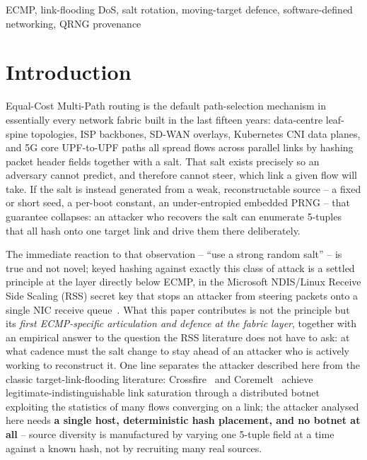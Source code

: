 \documentclass[conference]{IEEEtran}
\begin{document}
\begin{abstract}
CSPRNG case under this threat model -- an honest null result -- but the QRNG-as-a-service channel adds a
practical, auditable capability a CSPRNG cannot: a signed, per-draw entropy provenance receipt suited to
compliance- and attestation-sensitive multi-tenant deployments. We position the contribution carefully against
adjacent prior art -- the RSS secret-key defence for NIC receive-queue flooding, single-shard flooding in
sharded systems, and the Crossfire/Coremelt line of source-indistinguishable link-flooding attacks -- and frame
salt rotation as a Moving-Target-Defence instance applied to the ECMP hash rather than a novel mechanism in
isolation.
\end{abstract}

\begin{IEEEkeywords}
ECMP, link-flooding DoS, salt rotation, moving-target defence, software-defined networking, QRNG provenance
\end{IEEEkeywords}

\section{Introduction}

Equal-Cost Multi-Path routing is the default path-selection mechanism in essentially every network fabric built
in the last fifteen years: data-centre leaf-spine topologies, ISP backbones, SD-WAN overlays, Kubernetes CNI data
planes, and 5G core UPF-to-UPF paths all spread flows across parallel links by hashing packet header fields
together with a salt. That salt exists precisely so an adversary cannot predict, and therefore cannot steer,
which link a given flow will take. If the salt is instead generated from a weak, reconstructable source -- a
fixed or short seed, a per-boot constant, an under-entropied embedded PRNG -- that guarantee collapses: an
attacker who recovers the salt can enumerate 5-tuples that all hash onto one target link and drive them there
deliberately.

The immediate reaction to that observation -- ``use a strong random salt'' -- is true and not novel; keyed hashing
against exactly this class of attack is a settled principle at the layer directly below ECMP, in the Microsoft
NDIS/Linux Receive Side Scaling (RSS) secret key that stops an attacker from steering packets onto a single NIC
receive queue~\cite{rsskey}. What this paper contributes is not the principle but its \emph{first ECMP-specific
articulation and defence at the fabric layer}, together with an empirical answer to the question the RSS
literature does not have to ask: at what cadence must the salt change to stay ahead of an attacker who is
actively working to reconstruct it. One line separates the attacker described here from the classic
target-link-flooding literature: Crossfire~\cite{crossfire} and Coremelt~\cite{coremelt} achieve
legitimate-indistinguishable link saturation through a distributed botnet exploiting the statistics of many
flows converging on a link; the attacker analysed here needs \textbf{a single host, deterministic hash placement,
and no botnet at all} -- source diversity is manufactured by varying
one 5-tuple field at a time against a known hash, not by recruiting many real sources.
\end{document}
